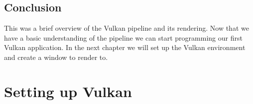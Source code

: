 \documentclass[12pt]{report} \usepackage{preamble}
\begin{document}
\section{Conclusion}

This was a brief overview of the Vulkan pipeline and its rendering. Now that we have a basic understanding of the pipeline we can start
programming our first Vulkan application. In the next chapter we will set up the Vulkan environment and create a window to render to.

\chapter{Setting up Vulkan}


\printbibliography[
	heading=bibintoc, title={Bibliography}
]

\listoffigures
\end{document}
